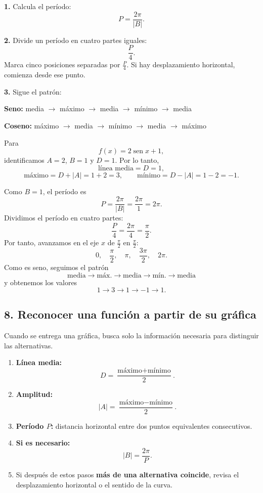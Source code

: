 \documentclass[12pt,letterpaper]{article}
\providecommand{\sen}{\operatorname{sen}}
\begin{document}
\begin{estrategiabox}[Procedimiento]
\textbf{1.} Calcula el período:
\[
P=\frac{2\pi}{|B|}.
\]

\textbf{2.} Divide un período en cuatro partes iguales:
\[
\boxed{\frac{P}{4}}.
\]
Marca cinco posiciones separadas por $\frac{P}{4}$. Si hay desplazamiento horizontal, comienza desde ese punto.

\textbf{3.} Sigue el patrón:

\begin{center}
\textbf{Seno:}
\quad
media $\rightarrow$ máximo $\rightarrow$ media $\rightarrow$ mínimo $\rightarrow$ media

\medskip
\textbf{Coseno:}
\quad
máximo $\rightarrow$ media $\rightarrow$ mínimo $\rightarrow$ media $\rightarrow$ máximo
\end{center}
\end{estrategiabox}

\begin{ejemplobox}
Para
\[
f(x)=2\sen x+1,
\]
identificamos $A=2$, $B=1$ y $D=1$. Por lo tanto,
\[
\text{línea media}=D=1,
\]
\[
\text{máximo}=D+|A|=1+2=3,
\qquad
\text{mínimo}=D-|A|=1-2=-1.
\]

Como $B=1$, el período es
\[
P=\frac{2\pi}{|B|}=\frac{2\pi}{1}=2\pi.
\]
Dividimos el período en cuatro partes:
\[
\frac{P}{4}=\frac{2\pi}{4}=\frac{\pi}{2}.
\]
Por tanto, avanzamos en el eje $x$ de $\frac{\pi}{2}$ en $\frac{\pi}{2}$:
\[
0,\quad \frac{\pi}{2},\quad \pi,\quad \frac{3\pi}{2},\quad 2\pi.
\]
Como es seno, seguimos el patrón
\[
\boxed{\text{media}\rightarrow\text{máx.}\rightarrow\text{media}\rightarrow\text{mín.}\rightarrow\text{media}}
\]
y obtenemos los valores
\[
\boxed{1\rightarrow3\rightarrow1\rightarrow-1\rightarrow1}.
\]
\end{ejemplobox}

\newpage
\subsection{8. Reconocer una función a partir de su gráfica}

Cuando se entrega una gráfica, busca solo la información necesaria para distinguir las alternativas.

\begin{estrategiabox}[Procedimiento]
\begin{enumerate}[leftmargin=*,itemsep=0.15em]
    \item \textbf{Línea media:}
    \[
    D=\frac{\text{máximo}+\text{mínimo}}{2}.
    \]
    \item \textbf{Amplitud:}
    \[
    |A|=\frac{\text{máximo}-\text{mínimo}}{2}.
    \]
    \item \textbf{Período $P$:} distancia horizontal entre dos puntos equivalentes consecutivos.
    \item \textbf{Si es necesario:}
    \[
    |B|=\frac{2\pi}{P}.
    \]
    \item Si después de estos pasos \textbf{más de una alternativa coincide}, revisa el desplazamiento horizontal o el sentido de la curva.
\end{enumerate}
\end{estrategiabox}
\end{document}
